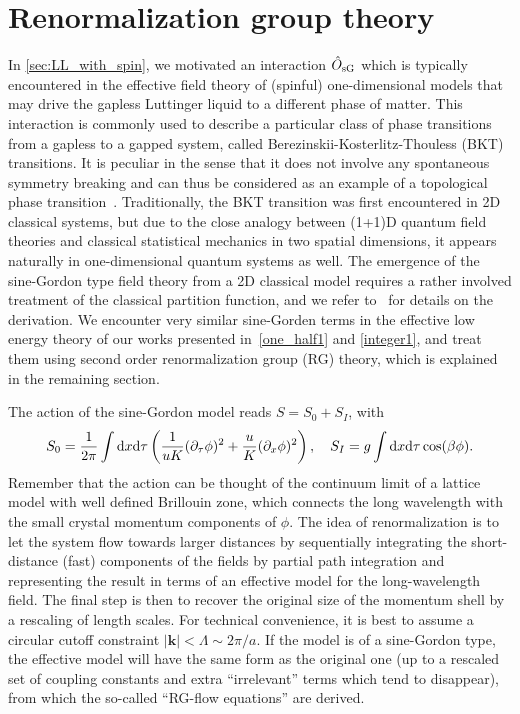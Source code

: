 \section{Renormalization group theory}
\label{sec:renormalization_group_theory}
In \cref{sec:LL_with_spin}, we motivated an interaction $\hat O_{\rm sG}$ which is typically encountered in the effective field theory of (spinful) one-dimensional models that may drive the gapless Luttinger liquid to a different phase of matter.
This interaction is commonly used to describe a particular class of phase transitions from a gapless to a gapped system, called Berezinskii-Kosterlitz-Thouless (BKT) transitions.
It is peculiar in the sense that it does not involve any spontaneous symmetry breaking and can thus be considered as an example of a topological phase transition~\cite{AltlandSimons2010}.
Traditionally, the BKT transition was first encountered in 2D classical systems, but due to the close analogy between (1+1)D quantum field theories and classical statistical mechanics in two spatial dimensions, it appears naturally in one-dimensional quantum systems as well.
The emergence of the sine-Gordon type field theory from a 2D classical model requires a rather involved treatment of the classical partition function, and we refer to~\cite{Kosterlitz1974,AltlandSimons2010} for details on the derivation.
We encounter very similar sine-Gorden terms in the effective low energy theory of our works presented in~\cref{one_half1} and \cref{integer1}, and treat them using second order renormalization group (RG) theory, which is explained in the remaining section.

The action of the sine-Gordon model reads $S = S_0 + S_I$, with
\begin{align}
    S_0 = \frac1{2\pi}\int\mathrm d x\mathrm d\tau\left( \frac1{uK}(\partial_\tau\phi)^2 + \frac uK (\partial_x\phi)^2 \right)
    ,\quad
    S_I = g\int\mathrm d x\mathrm d\tau\cos(\beta\phi)
    .
\end{align}
Remember that the action can be thought of the continuum limit of a lattice model with well defined Brillouin zone, which connects the long wavelength with the small crystal momentum components of $\phi$.
The idea of renormalization is to let the system flow towards larger distances by sequentially integrating the short-distance (fast) components of the fields by partial path integration and representing the result in terms of an effective model for the long-wavelength field.
The final step is then to recover the original size of the momentum shell by a rescaling of length scales.
For technical convenience, it is best to assume a circular cutoff constraint $|{\bm k}|<\Lambda\sim2\pi/a$.
If the model is of a sine-Gordon type, the effective model will have the same form as the original one (up to a rescaled set of coupling constants and extra ``irrelevant'' terms which tend to disappear), from which the so-called ``RG-flow equations'' are derived.

